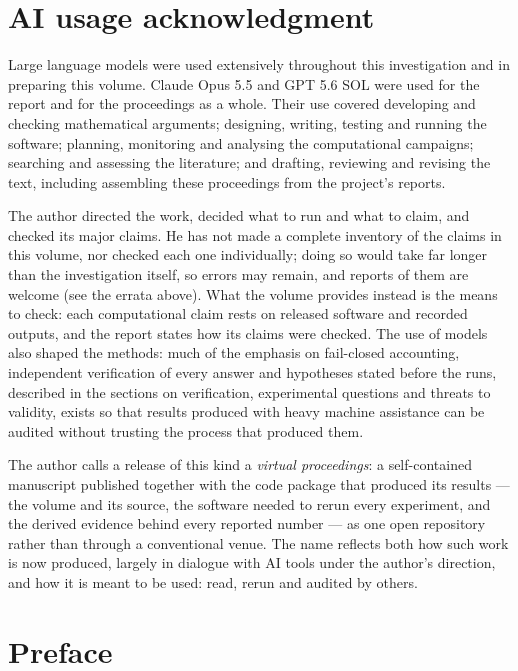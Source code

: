 \documentclass[11pt,a4paper]{article}
\begin{document}
\section*{AI usage acknowledgment}

Large language models were used extensively throughout this investigation and in preparing this
volume. Claude Opus 5.5 and GPT 5.6 SOL were used for the report and for the proceedings as a
whole. Their use covered developing and checking mathematical arguments; designing, writing,
testing and running the software; planning, monitoring and analysing the computational campaigns;
searching and assessing the literature; and drafting, reviewing and revising the text, including
assembling these proceedings from the project's reports.

The author directed the work, decided what to run and what to claim, and checked its major
claims. He has not made a complete inventory of the claims in this volume, nor checked each one
individually; doing so would take far longer than the investigation itself, so errors may remain,
and reports of them are welcome (see the errata above). What the volume provides instead is the
means to check: each computational claim rests on released software and recorded outputs, and the
report states how its claims were checked. The use of models also shaped the methods: much of the
emphasis on fail-closed accounting, independent verification of every answer and hypotheses stated
before the runs, described in the sections on verification, experimental questions and threats to
validity, exists so that results produced with heavy machine assistance can be audited without
trusting the process that produced them.

The author calls a release of this kind a \emph{virtual proceedings}: a self-contained manuscript
published together with the code package that produced its results --- the volume and its source,
the software needed to rerun every experiment, and the derived evidence behind every reported
number --- as one open repository rather than through a conventional venue. The name reflects both
how such work is now produced, largely in dialogue with AI tools under the author's direction, and
how it is meant to be used: read, rerun and audited by others.

\section*{Preface}
\end{document}
